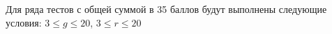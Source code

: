 Для ряда тестов с общей суммой в 35 баллов будут выполнены следующие условия: $3 \le g \le 20$, $3 \le r \le 20$